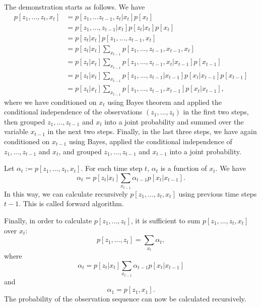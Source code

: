 \documentclass{article}
\begin{document}
The demonstration starts as follows.
We have
\begin{equation}
\begin{split}
    p[z_1,...,z_t,x_t] &= p[z_1,...z_{t-1},z_t|x_t]p[x_t] \label{eq1} \\
    &= p[z_1,...,z_{t-1}|x_t]p[z_t|x_t]p[x_t] \\
    &= p[z_t|x_t]p[z_1,...,z_{t-1},x_t] \\
    &= p[z_t|x_t]\sum_{x_{t-1}} p[z_1,...,z_{t-1},x_{t-1},x_t]\\
    &= p[z_t|x_t]\sum_{x_{t-1}} p[z_1,...,z_{t-1},x_t|x_{t-1}]p[x_{t-1}]\\
    &= p[z_t|x_t]\sum_{x_{t-1}} p[z_1,...,z_{t-1}|x_{t-1}]p[x_t|x_{t-1}]p[x_{t-1}]\\
    &= p[z_t|x_t]\sum_{x_{t-1}} p[z_1,...,z_{t-1},x_{t-1}]p[x_t|x_{t-1}], 
\end{split}
\end{equation} where we have conditioned on $x_t$ using Bayes theorem and applied the conditional independence of the observations $(z_1,...,z_t)$ in the first two steps, then grouped $z_1,...,z_{t-1}$ and $x_t$ into a joint probability and summed over the variable $x_{t-1}$ in the next two steps. Finally, in the last three steps, we have again conditioned on $x_{t-1}$ using Bayes, applied the conditional independence of $z_1,...,z_{t-1}$ and $x_t$, and grouped $z_1,...,z_{t-1}$ and $x_{t-1}$ into a joint probability. \newline

Let $\alpha_t := p[z_1,...,z_t,x_t]$. For each time step $t$, $\alpha_t$ is a function of $x_{t}$. We have 
\begin{equation}
\alpha_t = p[z_t|x_t] \sum_{x_{t-1}} \alpha_{t-1} p[x_t|x_{t-1}].   
\end{equation} 
In this way, we can calculate recursively $p[z_1,...,z_t,x_t]$  using previous time steps $t-1$. This is called forward algorithm. \newline


Finally, in order to calculate $p[z_1,...,z_t]$, it is sufficient to sum $p[z_1,...,z_t,x_t]$ over $x_t$:
\begin{equation}
p[z_1,...,z_t] = \sum_{x_t} \alpha_t,    
\end{equation} where
\begin{equation}
\alpha_t = p[z_t|x_t] \sum_{x_{t-1}} \alpha_{t-1} p[x_t|x_{t-1}]   
\end{equation} and
\begin{equation}
\alpha_1 = p[z_1,x_1].
\end{equation}
The probability of the observation sequence can now be calculated recursively.
\end{document}
